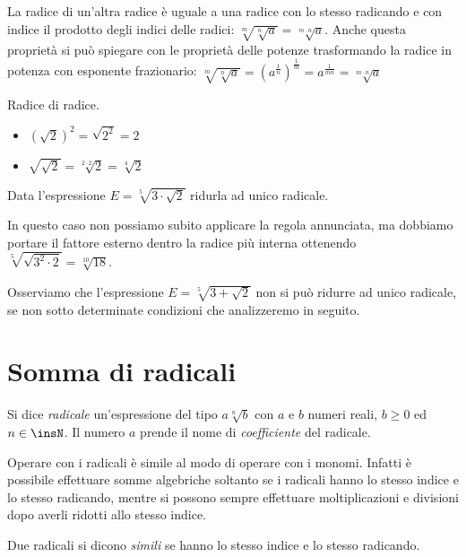 La radice di un'altra radice è uguale a una radice con lo stesso radicando
e con indice il prodotto degli indici delle radici:
$\sqrt[m]{\sqrt[n]a}=\sqrt[m\cdot n]a$.
Anche questa proprietà si può spiegare con le proprietà delle potenze
trasformando la radice in potenza con esponente frazionario:
$\sqrt[m]{\sqrt[n]a}=\left(a^{\frac 1 n}\right)^{\frac 1 m}=
 a^{\frac 1{mn}}=\sqrt[m\cdot n]a$

 \begin{esempio}
 Radice di radice.
 \begin{multicols}{2}
 \begin{itemize}
 \item $\left(\sqrt{2}\right)^2=\sqrt{2^2}=2$
 \item $\sqrt{\sqrt{2}}=\sqrt[2\cdot 2]2=\sqrt[4]2$
 \end{itemize}
 \end{multicols}
 \end{esempio}

 \begin{esempio}
 Data l'espressione $E=\sqrt[5]{3\cdot\sqrt{2}}$ ridurla ad unico radicale.

 In questo caso non possiamo subito applicare la regola annunciata, ma
dobbiamo  portare il fattore esterno dentro la radice più interna ottenendo
 $\sqrt[5]{\sqrt{3^2 \cdot 2}}=\sqrt[10]{18}$.

Osserviamo che l'espressione $E=\sqrt[5]{3+\sqrt{2}}$ non si può ridurre
ad unico radicale, se non sotto determinate condizioni che analizzeremo in
seguito.
 \end{esempio}

\section{Somma di radicali}
\label{sec:radicali_somma}

Si dice \emph{radicale} un'espressione del tipo $a\sqrt[n]b$ con $a$ e $b$
numeri reali, $b{\geq}0$ ed $n\in \insN$. Il numero $a$ prende il nome di
\emph{coefficiente} del radicale.

Operare con i radicali è simile al modo di operare con i monomi. Infatti è
possibile effettuare somme algebriche soltanto se i radicali hanno lo
stesso
indice e lo stesso radicando, mentre si possono sempre effettuare
moltiplicazioni e divisioni dopo averli ridotti allo stesso indice.
\begin{definizione}
 Due radicali si dicono \emph{simili} se hanno lo stesso indice e lo stesso
 radicando.
\end{definizione}

